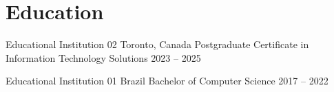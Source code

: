 \section*{Education}


\education
  {Educational Institution 02}
  {Toronto, Canada}
  {Postgraduate Certificate in Information Technology Solutions}
  {2023 – 2025}

\vspace{0.5em}

\education
  {Educational Institution 01}
  {Brazil}
  {Bachelor of Computer Science}
  {2017 – 2022}